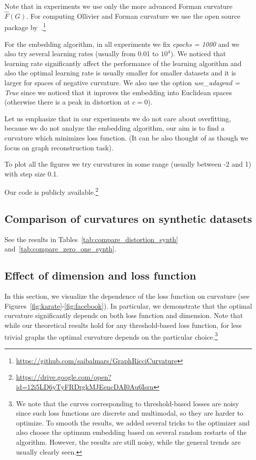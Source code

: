 \documentclass{article} %
\begin{document}
Note that in experiments we use only the more advanced Forman curvature $\hat{F}(G)$.
For computing Ollivier and Forman curvature we use the open source package by~\citet{ni2015ricci}.\footnote{\url{https://github.com/saibalmars/GraphRicciCurvature}}

For the embedding algorithm, in all experiments we fix \textit{epochs = 1000} and we also try several learning rates (usually from 0.01 to $10^4$). We noticed that learning rate significantly affect the performance of the learning algorithm and also the optimal learning rate is usually smaller for smaller datasets and it is larger for spaces of negative curvature. We also use the option \textit{use\_adagrad = True} since we noticed that it inproves the embedding into Euclidean spaces (otherwise there is a peak in distortion at $c = 0$).

Let us emphasize that in our experiments we do not care about overfitting, because we do not analyze the embedding algorithm, our aim is to find a curvature which minimizes loss function. (It can be also thought of as though we focus on graph reconstruction task).

To plot all the figures we try curvatures in some range (usually between -2 and 1) with step size 0.1.

Our code is publicly available.\footnote{\url{https://drive.google.com/open?id=12i5LD6yTyFRDrgkMJEencDAI0Au6Isrn}}

\subsection{Comparison of curvatures on synthetic datasets}\label{sec:compare_synth}

See the results in Tables~\ref{tab:compare_distortion_synth} and~\ref{tab:compare_zero_one_synth}.



\subsection{Effect of dimension and loss function}\label{sec:figures}

In this section, we visualize the dependence of the loss function on curvature (see Figures~\ref{fig:karate}-\ref{fig:facebook}). In particular, we demonstrate that the optimal curvature significantly depends on both loss function and dimension. Note that while our theoretical results hold for any threshold-based loss function, for less trivial graphs the optimal curvature depends on the particular choice.\footnote{We note that the curves corresponding to threshold-based losses are noisy since such loss functions are discrete and multimodal, so they are harder to optimize. To smooth the results, we added several tricks to the optimizer and also choose the optimum embedding based on several random restarts of the algorithm. However, the results are still noisy, while the general trends are usually clearly seen.} 
\end{document}
